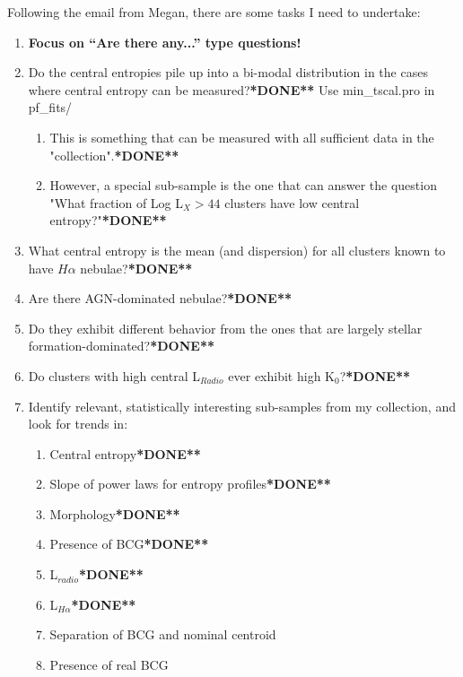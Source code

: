 \documentclass[11pt]{article}
\begin{document}
\renewcommand{\labelenumi}{\arabic{enumi}.}
\renewcommand{\labelenumii}{\arabic{enumi}.\arabic{enumii}}
\renewcommand{\labelenumiii}{\arabic{enumi}.\arabic{enumii}.\arabic{enumiii}}
\renewcommand{\labelenumiv}{\arabic{enumi}.\arabic{enumii}.\arabic{enumiii}.\arabic{enumiv}}

Following the email from Megan, there are some tasks I need to undertake:\\

\begin{enumerate}
\item {\bf Focus on ``Are there any...'' type questions!}
\item Do the central entropies pile up into a bi-modal distribution in
the cases where central entropy can be measured?{\bf **DONE**} Use min\_tscal.pro in pf\_fits/
\begin{enumerate}
\item  This is something that can be measured with all sufficient data
in the "collection".{\bf**DONE**}
\item However, a special sub-sample is the one that can answer the
question "What fraction of Log L$_X > 44$ clusters have low central
entropy?"{\bf**DONE**}
\end{enumerate}
\item What central entropy is the mean (and dispersion) for all
clusters known to have $H\alpha$ nebulae?{\bf**DONE**}
\item Are there AGN-dominated nebulae?{\bf**DONE**}
\item Do they exhibit different behavior from the ones that are
largely stellar formation-dominated?{\bf**DONE**}
\item Do clusters with high central L$_{Radio}$ ever exhibit high
K$_0$?{\bf**DONE**}
\item Identify relevant, statistically interesting sub-samples from my
collection, and look for trends in:
\begin{enumerate}
\item Central entropy{\bf**DONE**}
\item Slope of power laws for entropy profiles{\bf**DONE**}
\item Morphology{\bf**DONE**}
\item Presence of BCG{\bf**DONE**}
\item L$_{radio}${\bf**DONE**}
\item L$_{H\alpha}${\bf**DONE**}
\item Separation of BCG and nominal centroid
\item Presence of real BCG

\end{enumerate}
\end{enumerate}
\end{document}
